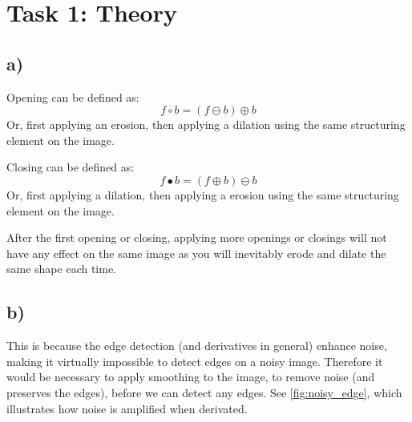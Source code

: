 \section{Task 1: Theory}
\subsection*{a)}
Opening can be defined as: 
\begin{equation}
    f \circ b = (f \ominus b) \oplus b
\end{equation}
Or, first applying an erosion, then applying a dilation using the same structuring element on the image. 

Closing can be defined as: 
\begin{equation}
    f \bullet b = (f \oplus b) \ominus b
\end{equation}
Or, first applying a dilation, then applying a erosion using the same structuring element on the image. 

After the first opening or closing, applying more openings or closings will not have any effect on the same image as you will inevitably erode and dilate the same shape each time. 

\subsection*{b)}
This is because the edge detection (and derivatives in general) enhance noise, making it virtually impossible to detect edges on a noisy image. Therefore it would be necessary to apply smoothing to the image, to remove noise (and preserves the edges), before we can detect any edges. See \cref{fig:noisy_edge}, which illustrates how noise is amplified when derivated. 

